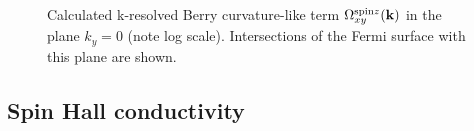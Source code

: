 \begin{figure}[htb!]
	\centering
	\qquad
	\caption{Calculated k-resolved Berry curvature-like term $\Omega_{xy}^{\text{spin}z}(\bfk)$ in the plane $k_y=0$ (note log scale). Intersections of the Fermi surface
		with this plane are shown.}
	\label{fig29.2}
\end{figure}

\clearpage
\subsection*{Spin Hall conductivity}

